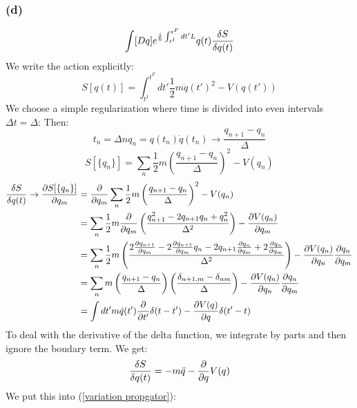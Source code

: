 \documentclass{article}
\begin{document}
\subsubsection*{(d)}
\begin{equation} \label{variation propgator}
    \int [Dq] e^{\frac{i}{\hbar}\int_{t^I}^{t^F}dt'L}q(t)\fdv{S}{q(t)}
\end{equation}
We write the action explicitly:\\
\begin{equation}
    S[q(t)]=\int_{t^I}^{t^F}dt'\frac{1}{2}m\dot{q}(t')^2-V(q(t'))
\end{equation}
We choose a simple regularization where time is divided into even intervals $\Delta t=\Delta$:
Then:
\begin{equation*}
    t_n = \Delta n
    q_n = q(t_n)
    \dot{q}(t_n)\rightarrow \frac{q_{n+1}-q_n}{\Delta}
\end{equation*}
\begin{equation}
    S[\{q_n\}]=\sum_n\frac{1}{2}m\left(\frac{q_{n+1}-q_n}{\Delta}\right)^2-V(q_n)
\end{equation}
\begin{equation*}
\begin{split}
        \fdv{S}{q(t)}\rightarrow\pdv{S[\{q_n\}]}{q_m}
        &=\pdv{q_m}\sum_n \frac{1}{2}m\left(\frac{q_{n+1}-q_n}{\Delta}\right)^2-V(q_n)\\
        &=\sum_n \frac{1}{2}m\pdv{q_m}\left(\frac{q^2_{n+1}-2q_{n+1}q_n+q^2_n}{\Delta^2}\right)-\pdv{V(q_n)}{q_m}\\
        &=\sum_n \frac{1}{2}m\left(\frac{2\pdv{q_{n+1}}{q_m}-2\pdv{q_{n+1}}{q_m}q_n-2q_{n+1}\pdv{q_n}{q_m}+2\pdv{q_n}{q_m}}{\Delta^2}\right)-\pdv{V(q_n)}{q_n}\pdv{q_n}{q_m}\\
        &=\sum_n m\left(\frac{q_{n+1}-q_n}{\Delta}\right)\left(\frac{\delta_{n+1,m}-\delta_{nm}}{\Delta}\right)-\pdv{V(q_n)}{q_n}\pdv{q_n}{q_m}\\
        &=\int dt' m\dot{q}(t')\pdv{t'}\delta(t-t')-\pdv{V(q)}{q}\delta(t'-t)
\end{split}
\end{equation*}
To deal with the derivative of the delta function, we integrate by parts and then ignore the boudary term. We get:
\begin{equation*}
\begin{split}
        \fdv{S}{q(t)}=-m\ddot{q}-\pdv{q}V(q)
\end{split}
\end{equation*}
We put this into (\ref{variation propgator}):
\end{document}
